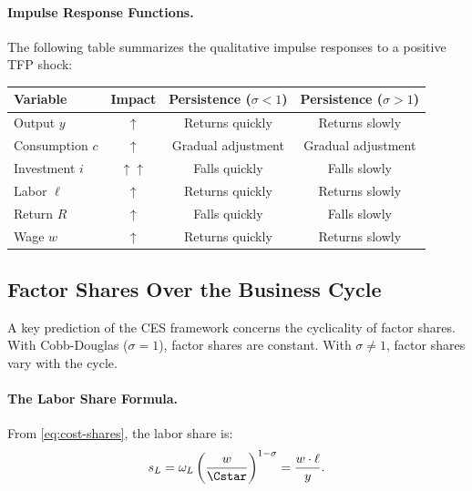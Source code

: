 \paragraph{Impulse Response Functions.}
The following table summarizes the qualitative impulse responses to a positive TFP shock:

\begin{center}
\renewcommand{\arraystretch}{1.3}
\begin{tabular}{@{}lccc@{}}
\toprule
\textbf{Variable} & \textbf{Impact} & \textbf{Persistence} ($\sigma < 1$) & \textbf{Persistence} ($\sigma > 1$) \\
\midrule
Output $y$ & $\uparrow$ & Returns quickly & Returns slowly \\
Consumption $c$ & $\uparrow$ & Gradual adjustment & Gradual adjustment \\
Investment $i$ & $\uparrow\uparrow$ & Falls quickly & Falls slowly \\
Labor $\ell$ & $\uparrow$ & Returns quickly & Returns slowly \\
Return $R$ & $\uparrow$ & Falls quickly & Falls slowly \\
Wage $w$ & $\uparrow$ & Returns quickly & Returns slowly \\
\bottomrule
\end{tabular}
\end{center}

\subsection{Factor Shares Over the Business Cycle}
\label{subsec:rbc-shares}

A key prediction of the CES framework concerns the cyclicality of factor shares. With Cobb-Douglas ($\sigma = 1$), factor shares are constant. With $\sigma \neq 1$, factor shares vary with the cycle.

\paragraph{The Labor Share Formula.}
From \cref{eq:cost-shares}, the labor share is:
\begin{equation}
s_L = \omega_L \left( \frac{w}{\Cstar} \right)^{1-\sigma} = \frac{w \cdot \ell}{y}.
\label{eq:labor-share-rbc}
\end{equation}

